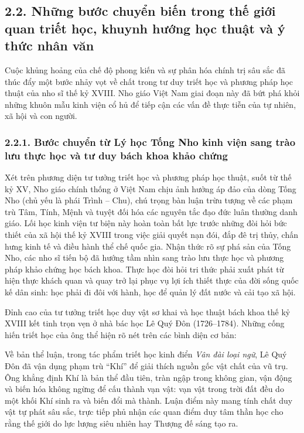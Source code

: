 \subsection*{2.2. Những bước chuyển biến trong thế giới quan triết học, khuynh hướng học thuật và ý thức nhân văn}

Cuộc khủng hoảng của chế độ phong kiến và sự phân hóa chính trị sâu sắc đã thúc đẩy một bước nhảy vọt về chất trong tư duy triết học và phương pháp học thuật của nho sĩ thế kỷ XVIII. Nho giáo Việt Nam giai đoạn này đã bứt phá khỏi những khuôn mẫu kinh viện cổ hủ để tiếp cận các vấn đề thực tiễn của tự nhiên, xã hội và con người.

\subsubsection*{2.2.1. Bước chuyển từ Lý học Tống Nho kinh viện sang trào lưu thực học và tư duy bách khoa khảo chứng}

Xét trên phương diện tư tưởng triết học và phương pháp học thuật, suốt từ thế kỷ XV, Nho giáo chính thống ở Việt Nam chịu ảnh hưởng áp đảo của dòng Tống Nho (chủ yếu là phái Trình -- Chu), chú trọng bàn luận trừu tượng về các phạm trù Tâm, Tính, Mệnh và tuyệt đối hóa các nguyên tắc đạo đức luân thường danh giáo. Lối học kinh viện tư biện này hoàn toàn bất lực trước những đòi hỏi bức thiết của xã hội thế kỷ XVIII trong việc giải quyết nạn đói, đắp đê trị thủy, chấn hưng kinh tế và điều hành thể chế quốc gia. Nhận thức rõ sự phá sản của Tống Nho, các nho sĩ tiến bộ đã hướng tầm nhìn sang trào lưu thực học và phương pháp khảo chứng học bách khoa. Thực học đòi hỏi tri thức phải xuất phát từ hiện thực khách quan và quay trở lại phục vụ lợi ích thiết thực của đời sống quốc kế dân sinh: học phải đi đôi với hành, học để quản lý đất nước và cải tạo xã hội.

Đỉnh cao của tư tưởng triết học duy vật sơ khai và học thuật bách khoa thế kỷ XVIII kết tinh trọn vẹn ở nhà bác học Lê Quý Đôn (1726--1784). Những cống hiến triết học của ông thể hiện rõ nét trên các bình diện cơ bản:

Về bản thể luận, trong tác phẩm triết học kinh điển \textit{Vân đài loại ngữ}, Lê Quý Đôn đã vận dụng phạm trù ``Khí'' để giải thích nguồn gốc vật chất của vũ trụ. Ông khẳng định Khí là bản thể đầu tiên, tràn ngập trong không gian, vận động và biến hóa không ngừng để cấu thành vạn vật: vạn vật trong trời đất đều do một khối Khí sinh ra và biến đổi mà thành. Luận điểm này mang tính chất duy vật tự phát sâu sắc, trực tiếp phủ nhận các quan điểm duy tâm thần học cho rằng thế giới do lực lượng siêu nhiên hay Thượng đế sáng tạo ra.

